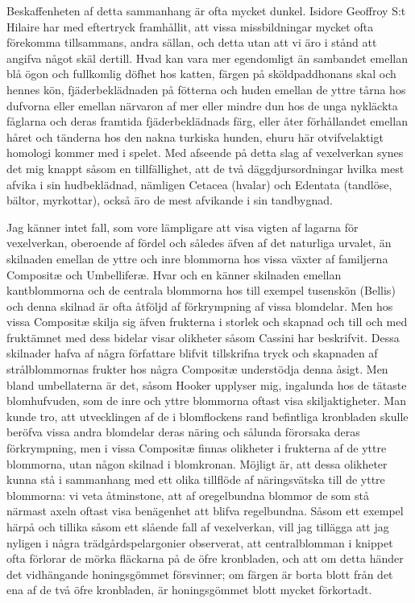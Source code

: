Beskaffenheten af detta sammanhang är ofta mycket dunkel. Isidore Geoffroy S:t Hilaire har med eftertryck framhållit, att vissa missbildningar mycket ofta förekomma tillsammans, andra sällan, och detta utan att vi äro i stånd att angifva något skäl dertill. Hvad kan vara mer egendomligt än sambandet emellan blå ögon och fullkomlig döfhet hos katten, färgen på sköldpaddhonans skal och hennes kön, fjäderbeklädnaden på fötterna och huden emellan de yttre tårna hos dufvorna eller emellan närvaron af mer eller mindre dun hos de unga nykläckta fåglarna och deras framtida fjäderbeklädnads färg, eller åter förhållandet emellan håret och tänderna hos den nakna turkiska hunden, ehuru här otvifvelaktigt homologi kommer med i spelet. Med afseende på detta slag af vexelverkan synes det mig knappt såsom en tillfällighet, att de två däggdjursordningar hvilka mest afvika i sin hudbeklädnad, nämligen Cetacea (hvalar) och Edentata (tandlöse, bältor, myrkottar), också äro de mest afvikande i sin tandbygnad.

Jag känner intet fall, som vore lämpligare att visa vigten af lagarna för vexelverkan, oberoende af fördel och således äfven af det naturliga urvalet, än skilnaden emellan de yttre och inre blommorna hos vissa växter af familjerna Compositæ och Umbelliferæ. Hvar och en känner skilnaden emellan kantblommorna och de centrala blommorna hos till exempel tusenskön (Bellis) och denna skilnad är ofta åtföljd af förkrympning af vissa blomdelar. Men hos vissa Compositæ skilja sig äfven frukterna i storlek och skapnad och till och med fruktämnet med dess bidelar visar olikheter såsom Cassini har beskrifvit. Dessa skilnader hafva af några författare blifvit tillskrifna tryck och skapnaden af strålblommornas frukter hos några Compositæ understödja denna åsigt. Men bland umbellaterna är det, såsom Hooker upplyser mig, ingalunda hos de tätaste blomhufvuden, som de inre och yttre blommorna oftast visa skiljaktigheter. Man kunde tro, att utvecklingen af de i blomflockens rand befintliga kronbladen skulle beröfva vissa andra blomdelar deras näring och sålunda förorsaka deras förkrympning, men i vissa Compositæ finnas olikheter i frukterna af de yttre blommorna, utan någon skilnad i blomkronan. Möjligt är, att dessa olikheter kunna stå i sammanhang med ett olika tillflöde af näringsvätska till de yttre blommorna: vi veta åtminstone, att af oregelbundna blommor de som stå närmast axeln oftast visa benägenhet att blifva regelbundna. Såsom ett exempel härpå och tillika såsom ett slående fall af vexelverkan, vill jag tillägga att jag nyligen i några trädgårdspelargonier observerat, att centralblomman i knippet ofta förlorar de mörka fläckarna på de öfre kronbladen, och att om detta händer det vidhängande honingsgömmet försvinner; om färgen är borta blott från det ena af de två öfre kronbladen, är honingsgömmet blott mycket förkortadt.

